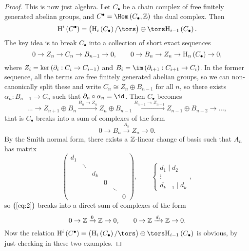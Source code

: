\begin{proof}
This is now just algebra. Let $ C_\bullet $ be a chain complex of free finitely generated abelian groups, and $ C^\bullet = \Hom\br{C_\bullet, \ZZ} $ the dual complex. Then
$$ \H^i\br{C^\bullet} = \br{\H_i\br{C_\bullet} / \tors} \oplus \tors \H_{i - 1}\br{C_\bullet}. $$
The key idea is to break $ C_\bullet $ into a collection of short exact sequences
$$ 0 \to Z_n \to C_n \to B_{n - 1} \to 0, \qquad 0 \to B_n \to Z_n \to \H_n\br{C_\bullet} \to 0, $$
where $ Z_i = \ker \br{\da_i : C_i \to C_{i - 1}} $ and $ B_i = \im \br{\da_{i + 1} : C_{i + 1} \to C_i} $. In the former sequence, all the terms are free finitely generated abelian groups, so we can non-canonically split these and write $ C_n \cong Z_n \oplus B_{n - 1} $ for all $ n $, so there exists $ \alpha_n : B_{n - 1} \to C_n $ such that $ \da_n \circ \alpha_n = \id $. Then $ C_\bullet $ becomes
\begin{equation}
\label{eq:2}
\dots \to Z_{n + 1} \oplus B_n \xrightarrow{B_n \to Z_n} Z_n \oplus B_{n - 1} \xrightarrow{B_{n - 1} \to Z_{n - 1}} Z_{n - 1} \oplus B_{n - 2} \to \dots,
\end{equation}
that is $ C_\bullet $ breaks into a sum of complexes of the form
$$ 0 \to B_n \xrightarrow{A_n} Z_n \to 0. $$
By the Smith normal form, there exists a $ \mathbb{Z} $-linear change of basis such that $ A_n $ has matrix
$$
\begin{pmatrix}
d_1 & & & & & \\
& \ddots & & & & \\
& & d_k & & & \\
& & & 0 & & \\
& & & & \ddots & \\
& & & & & 0
\end{pmatrix},
\qquad
\begin{cases}
d_1 \mid d_2 \\
\vdots \\
d_{k - 1} \mid d_k
\end{cases},
$$
so $ \br{\ref{eq:2}} $ breaks into a direct sum of complexes of the form
$$ 0 \to \mathbb{Z} \xrightarrow{0} \mathbb{Z} \to 0, \qquad 0 \to \mathbb{Z} \xrightarrow{d_i} \mathbb{Z} \to 0. $$
Now the relation $ \H^i\br{C^\bullet} = \br{\H_i\br{C_\bullet} / \tors} \oplus \tors \H_{i - 1}\br{C_\bullet} $ is obvious, by just checking in these two examples.
\end{proof}

\pagebreak

